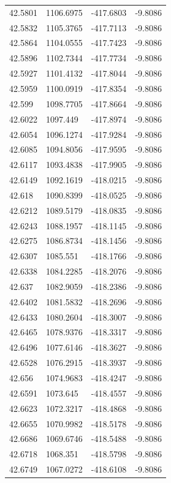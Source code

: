 \begin{table}[H]
\begin{tabular}{llll}
42.5801 & 1106.6975 & -417.6803 & -9.8086 \\
42.5832 & 1105.3765 & -417.7113 & -9.8086 \\
42.5864 & 1104.0555 & -417.7423 & -9.8086 \\
42.5896 & 1102.7344 & -417.7734 & -9.8086 \\
42.5927 & 1101.4132 & -417.8044 & -9.8086 \\
42.5959 & 1100.0919 & -417.8354 & -9.8086 \\
42.599 & 1098.7705 & -417.8664 & -9.8086 \\
42.6022 & 1097.449 & -417.8974 & -9.8086 \\
42.6054 & 1096.1274 & -417.9284 & -9.8086 \\
42.6085 & 1094.8056 & -417.9595 & -9.8086 \\
42.6117 & 1093.4838 & -417.9905 & -9.8086 \\
42.6149 & 1092.1619 & -418.0215 & -9.8086 \\
42.618 & 1090.8399 & -418.0525 & -9.8086 \\
42.6212 & 1089.5179 & -418.0835 & -9.8086 \\
42.6243 & 1088.1957 & -418.1145 & -9.8086 \\
42.6275 & 1086.8734 & -418.1456 & -9.8086 \\
42.6307 & 1085.551 & -418.1766 & -9.8086 \\
42.6338 & 1084.2285 & -418.2076 & -9.8086 \\
42.637 & 1082.9059 & -418.2386 & -9.8086 \\
42.6402 & 1081.5832 & -418.2696 & -9.8086 \\
42.6433 & 1080.2604 & -418.3007 & -9.8086 \\
42.6465 & 1078.9376 & -418.3317 & -9.8086 \\
42.6496 & 1077.6146 & -418.3627 & -9.8086 \\
42.6528 & 1076.2915 & -418.3937 & -9.8086 \\
42.656 & 1074.9683 & -418.4247 & -9.8086 \\
42.6591 & 1073.645 & -418.4557 & -9.8086 \\
42.6623 & 1072.3217 & -418.4868 & -9.8086 \\
42.6655 & 1070.9982 & -418.5178 & -9.8086 \\
42.6686 & 1069.6746 & -418.5488 & -9.8086 \\
42.6718 & 1068.351 & -418.5798 & -9.8086 \\
42.6749 & 1067.0272 & -418.6108 & -9.8086 \\

\end{tabular}
\end{table}
